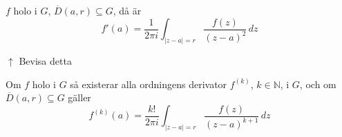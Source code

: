 \begin{theorem}
$f$ holo i $G$, $\overline{D}(a, r) \subseteq G$, då är
\[ f'(a) = \frac{1}{2\pi i}\int_{|z - a| = r} \frac{f(z)}{(z - a)^2}\,dz \]
\end{theorem}
\textcolor{magenta!80!black}{$\uparrow$ Bevisa detta}

\begin{note}
\underline{}

Om $f$ holo i $G$ så existerar alla ordningens derivator $f^{(k)}$, $k \in \mathbb{N}$, i $G$, och om $\overline{D}(a, r) \subseteq G$ gäller
\[ f^{(k)}(a) = \frac{k!}{2\pi i}\int_{|z - a| = r} \frac{f(z)}{(z - a)^{k + 1}}\,dz \]
\end{note}
